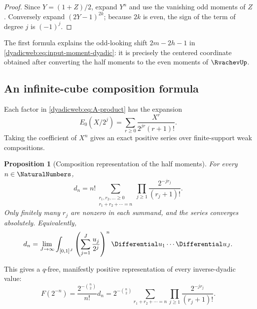 \documentclass[11pt,oneside]{article}
\newtheorem{proposition}[proposition]{Proposition}
\theoremstyle{definition}
\theoremstyle{remark}
\begin{document}
\begin{proof}
Since $Y=(1+Z)/2$, expand $Y^n$ and use the vanishing odd moments of $Z$.  Conversely expand
$(2Y-1)^{2k}$; because $2k$ is even, the sign of the term of degree $j$ is $(-1)^j$.
\end{proof}

The first formula explains the odd-looking shift $2m-2h-1$ in
\eqref{dyadicweb:eq:input-moment-dyadic}: it is precisely the centered coordinate obtained after
converting the half moments to the even moments of $\RvachevUp$.

\subsection{An infinite-cube composition formula}

Each factor in \eqref{dyadicweb:eq:A-product} has the expansion
\[
 E_0(X/2^j)=\sum_{r\ge0}\frac{X^r}{2^{jr}(r+1)!}.
\]
Taking the coefficient of $X^n$ gives an exact positive series over finite-support weak
compositions.

\begin{proposition}[Composition representation of the half moments]
\label{dyadicweb:prop:composition-d}
For every $n\in\NaturalNumbers$,
\begin{equation}
 d_n=n!\!
 \sum_{\substack{r_1,r_2,\ldots\ge0\\r_1+r_2+\cdots=n}}
 \prod_{j\ge1}\frac{2^{-jr_j}}{(r_j+1)!}.                 \label{dyadicweb:eq:composition-d}
\end{equation}
Only finitely many $r_j$ are nonzero in each summand, and the series converges absolutely.
Equivalently,
\begin{equation}
 d_n=\lim_{J\to\infty}\int_{[0,1]^J}
       \left(\sum_{j=1}^{J}\frac{u_j}{2^j}\right)^n
       \Differential u_1\cdots\Differential u_J.                              \label{dyadicweb:eq:cube-d}
\end{equation}
\end{proposition}

This gives a $q$-free, manifestly positive representation of every inverse-dyadic value:
\begin{equation}
 F(2^{-n})=\frac{2^{-\binom n2}}{n!}d_n
 =2^{-\binom n2}
 \sum_{r_1+r_2+\cdots=n}
 \prod_{j\ge1}\frac{2^{-jr_j}}{(r_j+1)!}.                \label{dyadicweb:eq:inverse-composition}
\end{equation}
\end{document}
